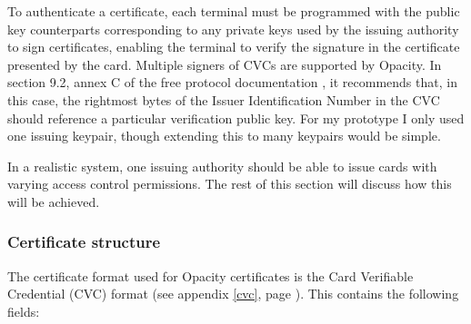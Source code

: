 \documentclass[12pt,a4paper]{article}
\begin{document}
To authenticate a certificate, each terminal must be programmed with the public key counterparts corresponding to any private keys used by the issuing authority to sign certificates, enabling the terminal to verify the signature in the certificate presented by the card. Multiple signers of CVCs are supported by Opacity. In section 9.2, annex C of the free protocol documentation \cite{opacityfree}, it recommends that, in this case, the rightmost bytes of the Issuer Identification Number in the CVC should reference a particular verification public key. For my prototype I only used one issuing keypair, though extending this to many keypairs would be simple.

In a realistic system, one issuing authority should be able to issue cards with varying access control permissions. The rest of this section will discuss how this will be achieved.


\subsubsection{Certificate structure}
The certificate format used for Opacity certificates is the Card Verifiable Credential (CVC) format (see appendix \ref{cvc}, page \pageref{cvc}). This contains the following fields:
\end{document}
